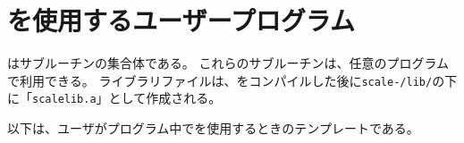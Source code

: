 \section{{\scalelib}を使用するユーザープログラム}

\scalelib はサブルーチンの集合体である。
これらのサブルーチンは、任意のプログラムで利用できる。
ライブラリファイルは、\scalelib をコンパイルした後に\texttt{scale-{\version}/lib/}の下に「\verb|scalelib.a|」として作成される。

以下は、ユーザがプログラム中で{\scalelib}を使用するときのテンプレートである。


